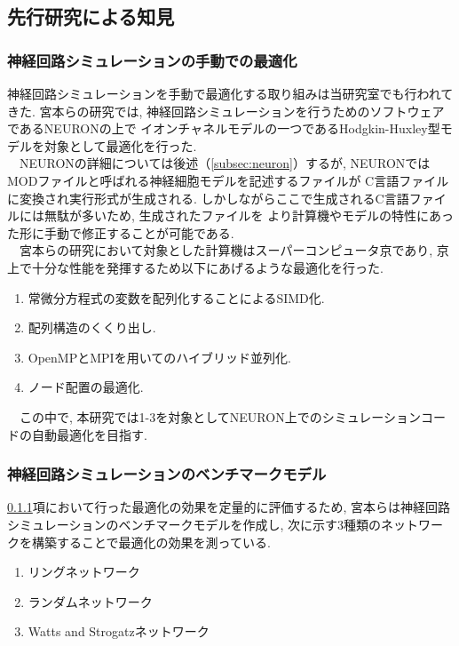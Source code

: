 \subsection{先行研究による知見}
\subsubsection{神経回路シミュレーションの手動での最適化}
\label{sec:section1-1-1}
神経回路シミュレーションを手動で最適化する取り組みは当研究室でも行われてきた.
宮本\cite{miyamoto-master}\cite{miyamoto-master-eng}らの研究では, 神経回路シミュレーションを行うためのソフトウェアであるNEURONの上で
イオンチャネルモデルの一つであるHodgkin-Huxley型モデルを対象として最適化を行った.\\
　NEURONの詳細については後述（\ref{subsec:neuron}）するが, NEURONではMODファイルと呼ばれる神経細胞モデルを記述するファイルが
C言語ファイルに変換され実行形式が生成される. しかしながらここで生成されるC言語ファイルには無駄が多いため, 生成されたファイルを
より計算機やモデルの特性にあった形に手動で修正することが可能である.\\
　宮本\cite{miyamoto-master}\cite{miyamoto-master-eng}らの研究において対象とした計算機はスーパーコンピュータ京であり, 京上で十分な性能を発揮するため以下にあげるような最適化を行った.\\
\vspace{-0.5cm}
\begin{enumerate}
\item 常微分方程式の変数を配列化することによるSIMD化.
\item 配列構造のくくり出し.
\item OpenMPとMPIを用いてのハイブリッド並列化.
\item ノード配置の最適化.
\end{enumerate}
　この中で, 本研究では1-3を対象としてNEURON上でのシミュレーションコードの自動最適化を目指す.\\


\subsubsection{神経回路シミュレーションのベンチマークモデル}
\label{subsec:bench-model}
\ref{sec:section1-1-1}項において行った最適化の効果を定量的に評価するため,
宮本\cite{miyamoto-master}\cite{miyamoto-master-eng}らは神経回路シミュレーションのベンチマークモデルを作成し,
次に示す3種類のネットワークを構築することで最適化の効果を測っている.\\
\begin{enumerate}
\item リングネットワーク
\item ランダムネットワーク
\item Watts and Strogatzネットワーク
\end{enumerate}

